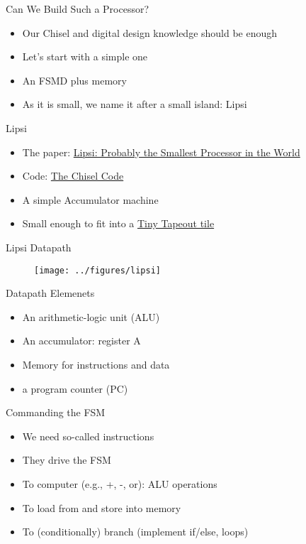 \begin{frame}[fragile]{Can We Build Such a Processor?}
\begin{itemize}
\item Our Chisel and digital design knowledge should be enough
\item Let's start with a simple one
\item An FSMD plus memory
\item As it is small, we  name it after a small island: Lipsi
\end{itemize}
\end{frame}

\begin{frame}[fragile]{Lipsi}
\begin{itemize}
\item The paper: \href{https://www.jopdesign.com/doc/lipsi.pdf}{Lipsi: Probably the Smallest Processor in the World}
\item Code: \href{https://github.com/schoeberl/lipsi}{The Chisel Code}
\item A simple Accumulator machine
\item Small enough to fit into a \href{https://github.com/schoeberl/tt06-lipsi}{Tiny Tapeout tile}
\end{itemize}
\end{frame}


\begin{frame}[fragile]{Lipsi Datapath}
\begin{figure}
  \texttt{[image: ../figures/lipsi]}
\end{figure}
\end{frame}

\begin{frame}[fragile]{Datapath Elemenets}
\begin{itemize}
\item An arithmetic-logic unit (ALU)
\item An accumulator: register A
\item Memory for instructions and data
\item a program counter (PC)
\end{itemize}
\end{frame}

\begin{frame}[fragile]{Commanding the FSM}
\begin{itemize}
\item We need so-called instructions
\item They drive the FSM
\item To computer (e.g., +, -, or): ALU operations
\item To load from and store into memory
\item To (conditionally) branch (implement if/else, loops)
\end{itemize}
\end{frame}

